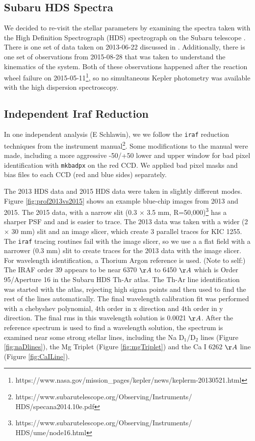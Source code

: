 \documentclass[preprint]{aastex61}
\newcommand{\shStar}{KIC 1255}
\begin{document}
\subsection{Subaru HDS Spectra}

We decided to re-visit the stellar parameters by examining the spectra taken with the High Definition Spectrograph (HDS) spectrograph on the Subaru telescope \citep{noguchi2002hds}.
There is one set of data taken on 2013-06-22 discussed in \citet{kawahara2013starspots}.
Additionally, there is one set of observations from 2015-08-28 that was taken to understand the kinematics of the system.
Both of these observations happened after the reaction wheel failure on 2015-05-11\footnote{https://www.nasa.gov/mission\_pages/kepler/news/keplerm-20130521.html}, so no simultaneous Kepler photometry was available with the high dispersion spectroscopy.

\subsection{Independent Iraf Reduction}

In one independent analysis (E Schlawin), we we follow the \texttt{iraf} reduction techniques from the instrument manual\footnote{https://www.subarutelescope.org/Observing/Instruments/\\HDS/specana2014.10e.pdf}.
Some modifications to the manual were made, including a more aggressive -50/+50 lower and upper window for bad pixel identification with \texttt{mkbadpx} on the red CCD.
We applied bad pixel masks and bias files to each CCD (red and blue sides) separately.

The 2013 HDS data and 2015 HDS data were taken in slightly different modes.
Figure \ref{fig:prof2013vs2015} shows an example blue-chip images from 2013 and 2015.
The 2015 data, with a narrow slit (0.3 $\times$ 3.5 mm, R=50,000)\footnote{https://www.subarutelescope.org/Observing/Instruments/\\HDS/ume/node16.html} has a sharper PSF and and is easier to trace.
The 2013 data was taken with a wider (2 $\times$ 30 mm) slit and an image slicer, which create 3 parallel traces for \shStar.
The \texttt{iraf} tracing routines fail with the image slicer, so we use a a flat field with a narrower (0.3 mm) slit to create traces for the 2013 data with the image slicer.
For wavelength identification, a Thorium Argon reference is used.
(Note to self:) The IRAF order 39 appears to be near 6370 $\AA$ to 6450 $\AA$ which is Order 95/Aperture 16 in the Subaru HDS Th-Ar atlas.
The Th-Ar line identification was started with the atlas, rejecting high sigma points and then used to find the rest of the lines automatically.
The final wavelength calibration fit was performed with a chebyshev polynomial, 4th order in x direction and 4th order in y direction.
The final rms in this wavelength solution is 0.0021 $\AA$.
After the reference spectrum is used to find a wavelength solution, the spectrum is examined near some strong stellar lines, including the Na D$_1$/D$_2$ lines (Figure \ref{fig:naDlines}), the Mg Triplet (Figure \ref{fig:mgTriplet}) and the Ca I 6262 $\AA$ line (Figure \ref{fig:CaILine}).
\end{document}
